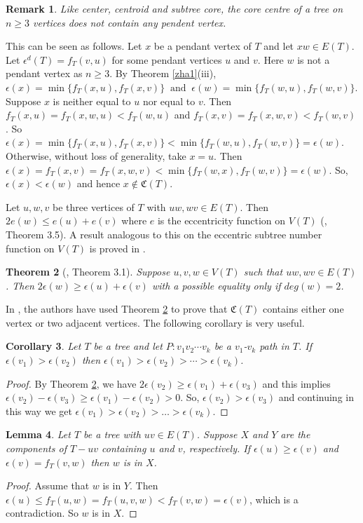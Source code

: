 \documentclass[10pt,a4paper]{amsart}
\newtheorem{theorem}{Theorem}[section]
\newtheorem{corollary}[theorem]{Corollary}
\newtheorem{lemma}[theorem]{Lemma}
\newtheorem{remark}[theorem]{Remark}
\begin{document}
\begin{remark}\label{reccentric}
Like center, centroid and subtree core, the core centre of a tree on $n\geq 3$ vertices does not contain any pendent vertex.
\end{remark}
This can be seen as follows. Let $x$ be a pendant vertex of $T$ and let $xw \in E(T)$. Let $\epsilon^d(T)=f_T(v,u)$ for some pendant vertices $u$ and $v$. Here $w$ is not a pendant vertex as $n\geq 3$. By Theorem \ref{zha1}(iii), $\epsilon(x)=\min\{f_T(x,u),f_T(x,v)\}\;\; \mbox{and}\;\; \epsilon(w)=\min\{f_T(w,u), f_T(w,v)\}$.  Suppose $x$ is neither equal to $u$ nor equal to $v$. Then $f_T(x,u)=f_T(x,w,u)<f_T(w,u)$ and $f_T(x,v)=f_T(x,w,v)<f_T(w,v)$. So $\epsilon(x)=\min\{f_T(x,u), f_T(x,v)\}<\min\{f_T(w,u), f_T(w,v)\}=\epsilon(w)$. Otherwise, without loss of generality, take $x=u$. Then $\epsilon(x)=f_T(x,v)=f_T(x,w,v)<\min\{f_T(w,x), f_T(w,v)\}=\epsilon(w)$. So, $\epsilon(x)<\epsilon(w)$ and hence $x\notin \mathfrak{C}(T)$.

Let $u,w,v$ be three vertices of $T$ with $uw,wv \in E(T)$. Then $2e(w)\leq e(u)+e(v)$ where $e$ is the eccentricity function on $V(T)$ (\cite{Pandey3}, Theorem 3.5). A result analogous to this on the eccentric subtree number function on $V(T)$ is proved in \cite{Zhang}.
\begin{theorem}[\cite{Zhang}, Theorem 3.1]\label{zha2}
Suppose $u,v,w\in V(T)$ such that $uw,wv \in E(T)$. Then $2\epsilon(w)\geq \epsilon(u)+\epsilon(v)$ with a possible equality only if $deg(w)=2$. 
\end{theorem}
In \cite{Zhang}, the authors have used Theorem \ref{zha2} to prove that $\mathfrak{C}(T)$ contains either one vertex or two adjacent vertices. The following corollary is very useful.
\begin{corollary}\label{cor1}
Let $T$ be a tree and let $P:v_1v_2\cdots v_k$ be a $v_1$-$v_k$ path in $T$. If $\epsilon(v_1)>\epsilon(v_2)$  then $\epsilon(v_1)>\epsilon(v_2)>\cdots>\epsilon(v_k)$. 
\end{corollary}
\begin{proof} By Theorem \ref{zha2}, we have $2\epsilon(v_2)\geq\epsilon(v_1)+\epsilon(v_3)$ and this implies $\epsilon(v_2)-\epsilon(v_3)\geq \epsilon(v_1)-\epsilon(v_2)>0$. So, $\epsilon(v_2)>\epsilon(v_3)$ and continuing in this way we get  $\epsilon(v_1)>\epsilon(v_2)>\ldots>\epsilon(v_k)$.  
\end{proof}


\begin{lemma}\label{lem2}
Let $T$ be a tree with $uv\in E(T)$. Suppose $X$ and $Y$ are the components of ${T}-uv$ containing $u$ and $v$, respectively. If $\epsilon(u)\geq \epsilon(v)$ and $\epsilon(v)=f_T(v,w)$ then $w$ is in $X$.    
\end{lemma}
\begin{proof} Assume that  $w$ is in $Y$. Then ${\epsilon}(u)\leq f_T(u,w)=f_T(u,v,w)<f_T(v,w)={\epsilon}(v)$, which is a contradiction. So $w$ is in $X$.  
\end{proof}
\end{document}
